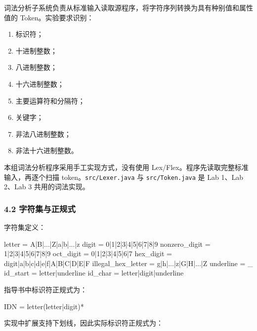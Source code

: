 \documentclass[
  a4paper,
  fontset=none,
]{ctexart}
\newenvironment{Shaded}{}{}
\newcommand{\NormalTok}[1]{#1}
\providecommand{\tightlist}{%
  \setlength{\itemsep}{0pt}\setlength{\parskip}{0pt}}
\begin{document}
词法分析子系统负责从标准输入读取源程序，将字符序列转换为具有种别值和属性值的
Token。实验要求识别：

\begin{enumerate}
\def\labelenumi{\arabic{enumi}.}
\tightlist
\item
  标识符；
\item
  十进制整数；
\item
  八进制整数；
\item
  十六进制整数；
\item
  主要运算符和分隔符；
\item
  关键字；
\item
  非法八进制整数；
\item
  非法十六进制整数。
\end{enumerate}

本组词法分析程序采用手工实现方式，没有使用
Lex/Flex。程序先读取完整标准输入，再逐个扫描
token。\texttt{src/Lexer.java} 与 \texttt{src/Token.java} 是 Lab 1、Lab
2、Lab 3 共用的词法实现。

\hypertarget{ux5b57ux7b26ux96c6ux4e0eux6b63ux89c4ux5f0f}{%
\subsubsection{4.2
字符集与正规式}\label{ux5b57ux7b26ux96c6ux4e0eux6b63ux89c4ux5f0f}}

字符集定义：

\begin{Shaded}
\begin{Highlighting}[]
\NormalTok{letter             = A|B|...|Z|a|b|...|z}
\NormalTok{digit              = 0|1|2|3|4|5|6|7|8|9}
\NormalTok{nonzero\_digit      = 1|2|3|4|5|6|7|8|9}
\NormalTok{oct\_digit          = 0|1|2|3|4|5|6|7}
\NormalTok{hex\_digit          = digit|a|b|c|d|e|f|A|B|C|D|E|F}
\NormalTok{illegal\_hex\_letter = g|h|...|z|G|H|...|Z}
\NormalTok{underline          = \_}
\NormalTok{id\_start           = letter|underline}
\NormalTok{id\_char            = letter|digit|underline}
\end{Highlighting}
\end{Shaded}

指导书中标识符正规式为：

\begin{Shaded}
\begin{Highlighting}[]
\NormalTok{IDN = letter(letter|digit)*}
\end{Highlighting}
\end{Shaded}

实现中扩展支持下划线，因此实际标识符正规式为：
\end{document}
